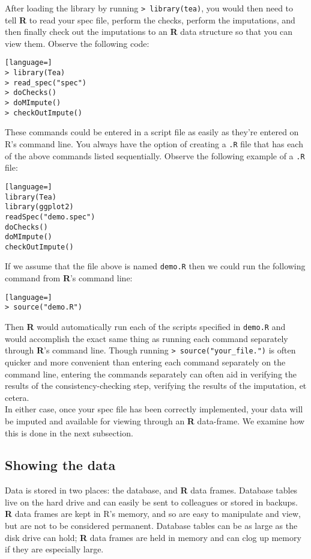 \documentclass{article}
\begin{document}
After loading the library by running {\tt > library(tea)}, you would then need to 
tell \textbf{R} to read your spec file, perform the checks, perform the imputations, 
and then finally check out the imputations to an \textbf{R} data structure so that you 
can view them. Observe the following code:

\begin{lstlisting}[language=]
> library(Tea)
> read_spec("spec")
> doChecks()
> doMImpute()
> checkOutImpute()
\end{lstlisting}

These commands could be entered in a script file as easily as they're entered on R's command line.
You always have the option of creating a {\tt .R} file that has each of the above commands listed 
sequentially. Observe the following example of a {\tt .R} file:

\begin{lstlisting}[language=]
library(Tea)
library(ggplot2)
readSpec("demo.spec")
doChecks()
doMImpute()
checkOutImpute()
\end{lstlisting}

If we assume that the file above is named {\tt demo.R} then we could run the following command 
from \textbf{R}'s command line:

\begin{lstlisting}[language=]
> source("demo.R")
\end{lstlisting}

Then \textbf{R} would automatically run each of the scripts specified in {\tt demo.R} and would 
accomplish the exact same thing as running each command separately through \textbf{R}'s command line.
Though running {\tt > source("your\_file.")} is often quicker and more convenient than entering 
each command separately on the command line, entering the commands separately can often aid in 
verifying the results of the consistency-checking step, verifying the results of the imputation, 
et cetera.\\

In either case, once your spec file has been correctly implemented, your data will be 
imputed and available for viewing through an \textbf{R} data-frame.
We examine how this is done in the next subsection.

\subsection{Showing the data}
Data is stored in two places: the database, and \textbf{R} data frames. Database tables
live on the hard drive and can easily be sent to colleagues or stored in
backups. \textbf{R} data frames are kept in R's memory, and so are easy to manipulate and
view, but are not to be considered permanent. Database tables can be as large as
the disk drive can hold; \textbf{R} data frames are held in memory and can clog up memory if
they are especially large.
\end{document}
